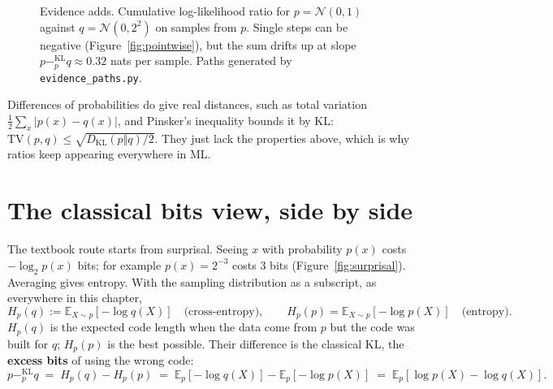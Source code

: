 \documentclass[11pt,oneside]{book}
\newcommand{\kl}[1]{\mathbin{-^{\mathrm{KL}}_{#1}}}       %
\newcommand{\DKL}{D_{\mathrm{KL}}}
\newcommand{\E}{\mathbb{E}}
\theoremstyle{definition}
\theoremstyle{plain}
\theoremstyle{remark}
\begin{document}
\begin{figure}[t]
\centering
{}
\caption{Evidence adds. Cumulative log-likelihood ratio for $p=\mathcal N(0,1)$ against $q=\mathcal N(0,2^2)$ on samples
from $p$. Single steps can be negative (Figure~\ref{fig:pointwise}), but the sum drifts up at slope $p\kl{p}q\approx0.32$
nats per sample. Paths generated by \texttt{evidence\_paths.py}.}
\label{fig:evidence}
\end{figure}

Differences of probabilities do give real distances, such as total variation $\tfrac12\sum_x\lvert p(x)-q(x)\rvert$, and
Pinsker's inequality bounds it by KL: $\mathrm{TV}(p,q)\le\sqrt{\DKL(p\Vert q)/2}$. They just lack the properties above,
which is why ratios keep appearing everywhere in ML.

\setcounter{figure}{0}
\section{The classical bits view, side by side}

The textbook route starts from surprisal. Seeing $x$ with probability $p(x)$ costs $-\log_2 p(x)$ bits; for example
$p(x)=2^{-3}$ costs $3$ bits (Figure~\ref{fig:surprisal}). Averaging gives entropy. With the sampling distribution as a
subscript, as everywhere in this chapter,
\[
H_p(q):=\E_{X\sim p}[-\log q(X)]\quad\text{(cross-entropy)},\qquad H_p(p)=\E_{X\sim p}[-\log p(X)]\quad\text{(entropy)}.
\]
$H_p(q)$ is the expected code length when the data come from $p$ but the code was built for $q$; $H_p(p)$ is the best
possible. Their difference is the classical KL, the \textbf{excess bits} of using the wrong code:
\[
p\kl{p}q\;=\;H_p(q)-H_p(p)\;=\;\E_p[-\log q(X)]-\E_p[-\log p(X)]\;=\;\E_p[\log p(X)-\log q(X)].
\]
\end{document}

